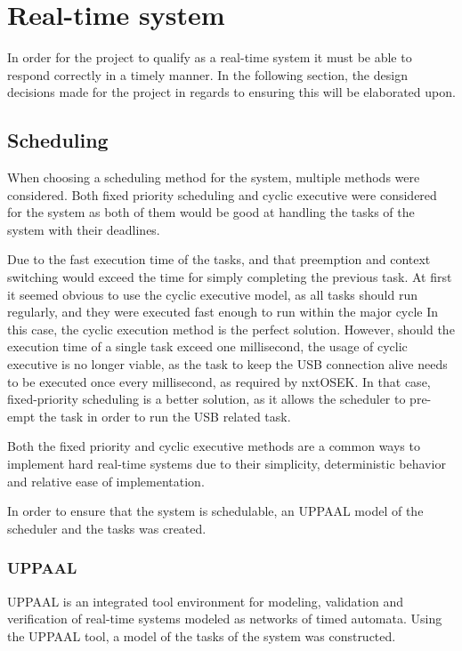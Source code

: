 \section{Real-time system}\label{Design:RTS} 
In order for the project to qualify as a real-time system it must be able to respond correctly in a timely manner.
In the following section, the design decisions made for the project in regards to ensuring this will be elaborated upon. 

\subsection{Scheduling}\label{Design:Scheduling}
When choosing a scheduling method for the system, multiple methods were considered. 
Both fixed priority scheduling and cyclic executive were considered for the system as both of them would be good at handling the tasks of the system with their deadlines.

Due to the fast execution time of the tasks, and that preemption and context switching would exceed the time for simply completing the previous task.
At first it seemed obvious to use the cyclic executive model, as all tasks should run regularly, and they were executed fast enough to run within the major cycle
In this case, the cyclic execution method is the perfect solution. 
However, should the execution time of a single task exceed one millisecond, the usage of cyclic executive is no longer viable, as the task to keep the USB connection alive needs to be executed once every millisecond, as required by nxtOSEK.
In that case, fixed-priority scheduling is a better solution, as it allows the scheduler to pre-empt the task in order to run the USB related task.

Both the fixed priority and cyclic executive methods are a common ways to implement hard real-time systems due to their simplicity, deterministic behavior and relative ease of implementation\cite{CyclicExecutionKimLarsen}.

In order to ensure that the system is schedulable, an UPPAAL model of the scheduler and the tasks was created. 

\subsubsection{UPPAAL}
UPPAAL is an integrated tool environment for modeling, validation and verification of real-time systems modeled as networks of timed automata\cite{UPPAALWebsite}. 
Using the UPPAAL tool, a model of the tasks of the system was constructed. 

